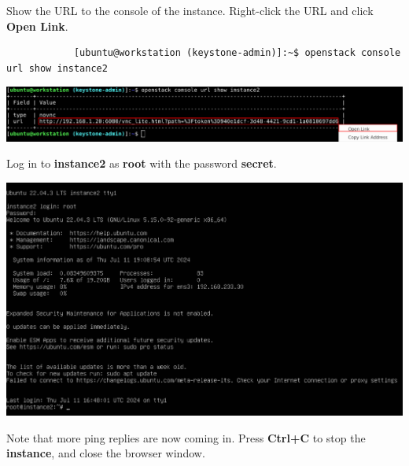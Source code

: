 \documentclass[letterpaper, 12pt]{article}
\begin{document}
\begin{enumerate}
    \begin{labstep}
        Show the URL to the console of the instance.
        Right-click the URL and click \textbf{Open Link}.
        \begin{lstlisting}
            [ubuntu@workstation (keystone-admin)]:~$ openstack console url show instance2
        \end{lstlisting}

        \begin{center}
            \includegraphics[width=\linewidth]{images/part4/step13.png}
        \end{center}
    \end{labstep}

    \begin{labstep}
        Log in to \textbf{instance2} as \textbf{root} with the password \textbf{secret}.

        \begin{center}
            \includegraphics[width=\linewidth]{images/part4/step14.png}
        \end{center}
    \end{labstep}

    \begin{labstep}
        Note that more ping replies are now coming in.
        Press \textbf{Ctrl+C} to stop the \textbf{instance}, and close the browser window.


\end{labstep}
\end{enumerate}
\end{document}
